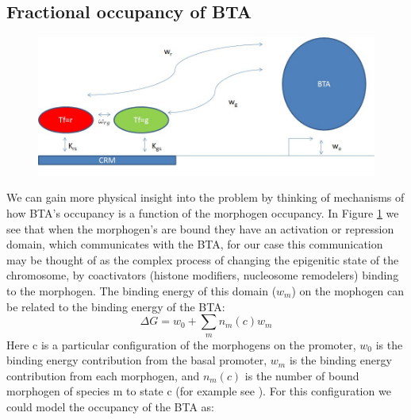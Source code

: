 
\subsection{ Fractional occupancy of BTA }
\begin{figure}
  \includegraphics[width=1\textwidth]{PlugandPlay}\\
  \caption{}\label{PlugandPlay}
\end{figure}

We can gain more physical insight into the problem by thinking of mechanisms of how BTA's occupancy is a function of the morphogen occupancy.  In Figure \ref{PlugandPlay} we see that when the morphogen's are bound they have an activation or repression domain, which communicates with the BTA, for our case this communication may be thought of as the complex process of changing the epigenitic state of the chromosome, by coactivators (histone modifiers, nucleosome remodelers) binding to the morphogen.  The binding energy of this domain ($w_m$) on the mophogen can be related to the binding energy of the BTA:
\begin{equation}\label{hilldg}
     \Delta G = w_{0} + \sum_{m}  n_m(c) w_{m}
\end{equation}
Here c is a particular configuration of the morphogens on the promoter, $w_0$ is the binding energy contribution from the basal promoter, $w_m$ is the binding energy contribution from each morphogen, and $n_m(c)$ is the number of bound morphogen of species m to state c (for example see \cite{pmid19956545}).  For this configuration we could model the occupancy of the BTA as:

